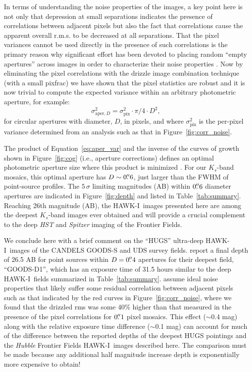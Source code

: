 \documentclass[preprint2]{aastex6}
\gdef\HAWKI{\mbox{HAWK-I}}
\begin{document}
In terms of understanding the noise properties of the images, a key point here is not only that depression at small separations indicates the presence of correlations between adjacent pixels but also the fact that correlations cause the apparent overall r.m.s. to be decreased at all separations.  That the pixel variances cannot be used directly in the presence of such correlations \citep{casertano:00} is the primary reason why significant effort has been devoted to placing random ``empty apertures'' across images in order to characterize their noise properties \citep[e.g.,][]{labbe:03,forster:06,quadri:musyc, whitaker:nmbs, skelton:14}.  Now by eliminating the pixel correlations with the drizzle image combination technique (with a small pixfrac) we have shown that the pixel statistics are robust and it is now trivial to compute the expected variance within an arbitrary photometric aperture, for example:
\begin{equation}
\sigma_{\mathrm{aper}, D}^2 = \sigma_\mathrm{pix}^2\cdot \pi/4 \cdot D^2,
\label{eq:aper_var}
\end{equation}
for circular apertures with diameter, $D$, in pixels, and where $\sigma_\mathrm{pix}^2$ is the per-pixel variance determined from an analysis such as that in Figure~\ref{fig:corr_noise}.

The product of Equation~\ref{eq:aper_var} and the inverse of the curves of growth shown in Figure~\ref{fig:cog} (i.e., aperture corrections) defines an optimal photometric aperture size where this product is minimized \citep{whitaker:nmbs}.  For our $K_s$-band mosaics, this optimal aperture has $D\sim0\mbox{$.\!\!^{\prime\prime}$}6$, just larger than the FWHM of point-source profiles.  The $5\,\sigma$ limiting magnitudes (AB) within $0\mbox{$.\!\!^{\prime\prime}$}6$ diameter apertures are indicated in Figure~\ref{fig:depth} and listed in Table~\ref{tab:summary}.  Reaching 26th magnitude (AB), the \HAWKI\ images presented here are among the deepest $K_s$-band images ever obtained and will provide a crucial complement to the deep \textit{HST} and \textit{Spitzer} imaging of the Frontier Fields.  

We conclude here with a brief comment on the ``HUGS'' ultra-deep \HAWKI\ images of the CANDELS GOODS-S and UDS survey fields.  \cite{hugs} report a final depth of 26.5 AB for point sources within $D=0\mbox{$.\!\!^{\prime\prime}$}4$ apertures for their deepest field, ``GOODS-D1'', which has an exposure time of 31.5 hours similar to the deep \HAWKI\ fields summarized in Table~\ref{tab:summary}.  \cite{hugs} assume ideal noise properties that likely suffer some residual correlation between adjacent pixels such as that indicated by the red curves in Figure~\ref{fig:corr_noise}, where we found that the drizzled rms was some 40\% higher than that measured in the presence of the pixel correlations for $0\mbox{$.\!\!^{\prime\prime}$}1$ pixel mosaics.  This effect ($\sim$0.4 mag) along with the relative exposure time difference ($\sim$0.1 mag) can account for much of the difference between the reported depths of the deepest HUGS pointings and the \textit{Hubble} Frontier Fields \HAWKI\ images described here.  The comparison must be made because any additional half magnitude increase depth is exponentially more expensive to obtain!
\end{document}
